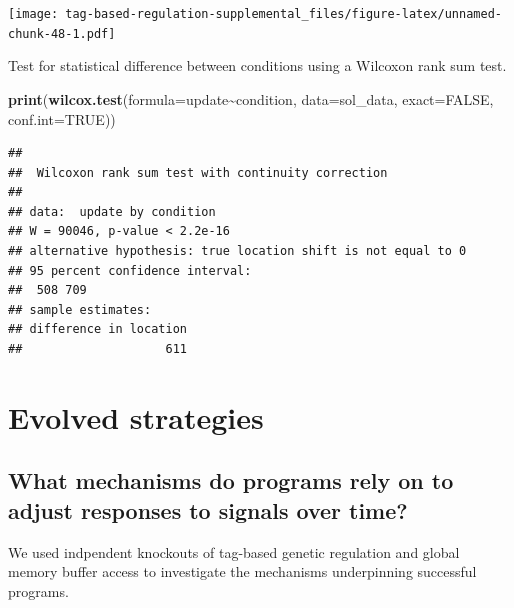 \documentclass[
]{book}
\newenvironment{Shaded}{\begin{snugshade}}{\end{snugshade}}
\newcommand{\DataTypeTok}[1]{\textcolor[rgb]{0.13,0.29,0.53}{#1}}
\newcommand{\KeywordTok}[1]{\textcolor[rgb]{0.13,0.29,0.53}{\textbf{#1}}}
\newcommand{\NormalTok}[1]{#1}
\newcommand{\OperatorTok}[1]{\textcolor[rgb]{0.81,0.36,0.00}{\textbf{#1}}}
\newcommand{\OtherTok}[1]{\textcolor[rgb]{0.56,0.35,0.01}{#1}}
\begin{document}
\texttt{[image: tag-based-regulation-supplemental\_files/figure-latex/unnamed-chunk-48-1.pdf]}

Test for statistical difference between conditions using a Wilcoxon rank sum test.

\begin{Shaded}
\begin{Highlighting}[]
\KeywordTok{print}\NormalTok{(}\KeywordTok{wilcox.test}\NormalTok{(}\DataTypeTok{formula=}\NormalTok{update}\OperatorTok{\textasciitilde{}}\NormalTok{condition, }\DataTypeTok{data=}\NormalTok{sol\_data, }\DataTypeTok{exact=}\OtherTok{FALSE}\NormalTok{, }\DataTypeTok{conf.int=}\OtherTok{TRUE}\NormalTok{))}
\end{Highlighting}
\end{Shaded}

\begin{verbatim}
## 
##  Wilcoxon rank sum test with continuity correction
## 
## data:  update by condition
## W = 90046, p-value < 2.2e-16
## alternative hypothesis: true location shift is not equal to 0
## 95 percent confidence interval:
##  508 709
## sample estimates:
## difference in location 
##                    611
\end{verbatim}

\hypertarget{evolved-strategies}{%
\section{Evolved strategies}\label{evolved-strategies}}

\hypertarget{what-mechanisms-do-programs-rely-on-to-adjust-responses-to-signals-over-time}{%
\subsection{What mechanisms do programs rely on to adjust responses to signals over time?}\label{what-mechanisms-do-programs-rely-on-to-adjust-responses-to-signals-over-time}}

We used indpendent knockouts of tag-based genetic regulation and global memory buffer access to investigate the mechanisms underpinning successful programs.
\end{document}
